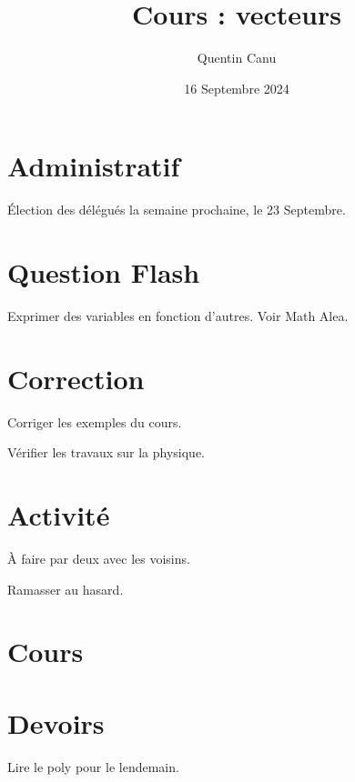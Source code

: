 \documentclass{article}
\title{Cours : vecteurs}
\date{16 Septembre 2024}
\author{Quentin Canu}
\begin{document}
\maketitle

\section{Administratif}
Élection des délégués la semaine prochaine, le 23 Septembre.

\section{Question Flash}
Exprimer des variables en fonction d'autres. Voir Math Alea.

\section{Correction}

Corriger les exemples du cours.

Vérifier les travaux sur la physique.

\section{Activité}

À faire par deux avec les voisins. 

Ramasser au hasard.

\section{Cours}
\section{Devoirs}

Lire le poly pour le lendemain.
\end{document}
